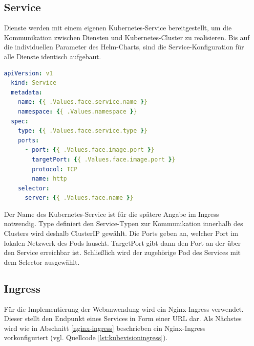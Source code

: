 \subsection{Service}
Dienste werden mit einem eigenen Kubernetes-Service bereitgestellt, um die Kommunikation zwischen Diensten und Kubernetes-Cluster zu realisieren.
Bis auf die individuellen Parameter des Helm-Charts, sind die Service-Konfiguration für alle Dienste identisch aufgebaut.

\begin{lstlisting}[caption={face-service.yaml},captionpos=b,label={lst:face-service},language=yaml]
  apiVersion: v1
  kind: Service
  metadata:
    name: {{ .Values.face.service.name }}
    namespace: {{ .Values.namespace }}
  spec:
    type: {{ .Values.face.service.type }}
    ports:
      - port: {{ .Values.face.image.port }}
        targetPort: {{ .Values.face.image.port }}
        protocol: TCP
        name: http
    selector:
      server: {{ .Values.face.name }}

\end{lstlisting}

Der Name des Kubernetes-Service ist für die spätere Angabe im Ingress notwendig.
Type definiert den Service-Typen zur Kommunikation innerhalb des Clusters wird deshalb ClusterIP gewählt.
Die Ports geben an, welcher Port im lokalen Netzwerk des Pods lauscht.
TargetPort gibt dann den Port an der über den Service erreichbar ist.
Schließlich wird der zugehörige Pod des Services mit dem Selector ausgewählt.


\subsection{Ingress}

Für die Implementierung der Webanwendung wird ein Nginx-Ingress verwendet.
Dieser stellt den Endpunkt eines Services in Form einer URL dar.
Als Nächstes wird wie in Abschnitt \ref{nginx-ingress} beschrieben ein Nginx-Ingress vorkonfiguriert (vgl. Quellcode \ref{lst:kubevisioningress}).


